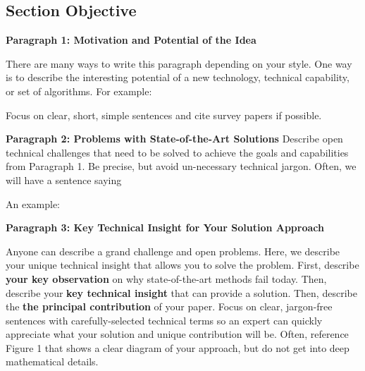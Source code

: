 \subsection{Section Objective}

\textbf{Paragraph 1: Motivation and Potential of the Idea}

There are many ways to write this paragraph depending on your style.
One way is to describe the interesting potential of a new technology, technical capability, or set of algorithms. For example: 

\begin{quote}
\end{quote}

Focus on clear, short, simple sentences and cite survey papers if possible.

\textbf{Paragraph 2: Problems with State-of-the-Art Solutions}
Describe open technical challenges that need to be solved to achieve the goals and capabilities from Paragraph 1. Be precise, but avoid un-necessary technical jargon. Often, we will have a sentence saying 

An example: 
\begin{quote}
\end{quote}

\textbf{Paragraph 3: Key Technical Insight for Your Solution Approach}

Anyone can describe a grand challenge and open problems. Here, we describe your unique technical insight that allows you to solve the problem. First, describe \textbf{your key observation} on why state-of-the-art methods fail today. Then, describe your \textbf{key technical insight} that can provide a solution.
Then, describe the \textbf{the principal contribution} of your paper. 
Focus on clear, jargon-free sentences with carefully-selected technical terms so an expert can quickly appreciate what your solution and unique contribution will be. Often, reference Figure 1 that shows a clear diagram of your approach, but do not get into deep mathematical details. 

